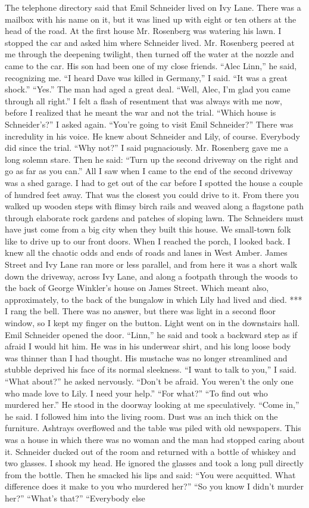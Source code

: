 \documentclass{novel}
\begin{document}
The telephone directory said that Emil Schneider lived on Ivy Lane. There was a mailbox with his name on it, but it was lined up with eight or ten others at the head of the road. At the first house Mr. Rosenberg was watering his lawn. I stopped the car and asked him where Schneider lived. Mr. Rosenberg peered at me through the deepening twilight, then turned off the water at the nozzle and came to the car. His son had been one of my close friends. “Alec Linn,” he said, recognizing me. “I heard Dave was killed in Germany,” I said. “It was a great shock.” “Yes.” The man had aged a great deal. “Well, Alec, I’m glad you came through all right.” I felt a flash of resentment that was always with me now, before I realized that he meant the war and not the trial. “Which house is Schneider’s?” I asked again. “You’re going to visit Emil Schneider?” There was incredulity in his voice. He knew about Schneider and Lily, of course. Everybody did since the trial. “Why not?” I said pugnaciously. Mr. Rosenberg gave me a long solemn stare. Then he said: “Turn up the second driveway on the right and go as far as you can.” All I saw when I came to the end of the second driveway was a shed garage. I had to get out of the car before I spotted the house a couple of hundred feet away. That was the closest you could drive to it. From there you walked up wooden steps with flimsy birch rails and weaved along a flagstone path through elaborate rock gardens and patches of sloping lawn. The Schneiders must have just come from a big city when they built this house. We small-town folk like to drive up to our front doors. When I reached the porch, I looked back. I knew all the chaotic odds and ends of roads and lanes in West Amber. James Street and Ivy Lane ran more or less parallel, and from here it was a short walk down the driveway, across Ivy Lane, and along a footpath through the woods to the back of George Winkler’s house on James Street. Which meant also, approximately, to the back of the bungalow in which Lily had lived and died. *** I rang the bell. There was no answer, but there was light in a second floor window, so I kept my finger on the button. Light went on in the downstairs hall. Emil Schneider opened the door. “Linn,” he said and took a backward step as if afraid I would hit him. He was in his underwear shirt, and his long loose body was thinner than I had thought. His mustache was no longer streamlined and stubble deprived his face of its normal sleekness. “I want to talk to you,” I said. “What about?” he asked nervously. “Don’t be afraid. You weren’t the only one who made love to Lily. I need your help.” “For what?” “To find out who murdered her.” He stood in the doorway looking at me speculatively. “Come in,” he said. I followed him into the living room. Dust was an inch thick on the furniture. Ashtrays overflowed and the table was piled with old newspapers. This was a house in which there was no woman and the man had stopped caring about it. Schneider ducked out of the room and returned with a bottle of whiskey and two glasses. I shook my head. He ignored the glasses and took a long pull directly from the bottle. Then he smacked his lips and said: “You were acquitted. What difference does it make to you who murdered her?” “So you know I didn’t murder her?” “What’s that?” “Everybody else 
\end{document}
